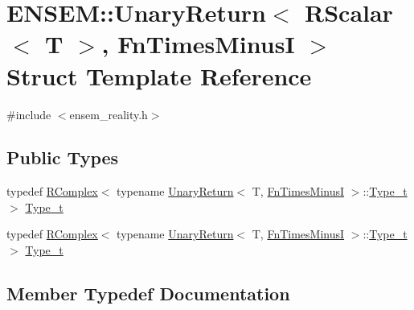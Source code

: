\hypertarget{structENSEM_1_1UnaryReturn_3_01RScalar_3_01T_01_4_00_01FnTimesMinusI_01_4}{}\section{E\+N\+S\+EM\+:\+:Unary\+Return$<$ R\+Scalar$<$ T $>$, Fn\+Times\+MinusI $>$ Struct Template Reference}
\label{structENSEM_1_1UnaryReturn_3_01RScalar_3_01T_01_4_00_01FnTimesMinusI_01_4}


{\ttfamily \#include $<$ensem\+\_\+reality.\+h$>$}

\subsection*{Public Types}
\begin{DoxyCompactItemize}
\item 
typedef \mbox{\hyperlink{classENSEM_1_1RComplex}{R\+Complex}}$<$ typename \mbox{\hyperlink{structENSEM_1_1UnaryReturn}{Unary\+Return}}$<$ T, \mbox{\hyperlink{structENSEM_1_1FnTimesMinusI}{Fn\+Times\+MinusI}} $>$\+::\mbox{\hyperlink{structENSEM_1_1UnaryReturn_3_01RScalar_3_01T_01_4_00_01FnTimesMinusI_01_4_a89dcc5ccc293077b2cb0c8328b6c883a}{Type\+\_\+t}} $>$ \mbox{\hyperlink{structENSEM_1_1UnaryReturn_3_01RScalar_3_01T_01_4_00_01FnTimesMinusI_01_4_a89dcc5ccc293077b2cb0c8328b6c883a}{Type\+\_\+t}}
\item 
typedef \mbox{\hyperlink{classENSEM_1_1RComplex}{R\+Complex}}$<$ typename \mbox{\hyperlink{structENSEM_1_1UnaryReturn}{Unary\+Return}}$<$ T, \mbox{\hyperlink{structENSEM_1_1FnTimesMinusI}{Fn\+Times\+MinusI}} $>$\+::\mbox{\hyperlink{structENSEM_1_1UnaryReturn_3_01RScalar_3_01T_01_4_00_01FnTimesMinusI_01_4_a89dcc5ccc293077b2cb0c8328b6c883a}{Type\+\_\+t}} $>$ \mbox{\hyperlink{structENSEM_1_1UnaryReturn_3_01RScalar_3_01T_01_4_00_01FnTimesMinusI_01_4_a89dcc5ccc293077b2cb0c8328b6c883a}{Type\+\_\+t}}
\end{DoxyCompactItemize}


\subsection{Member Typedef Documentation}
\mbox{\label{structENSEM_1_1UnaryReturn_3_01RScalar_3_01T_01_4_00_01FnTimesMinusI_01_4_a89dcc5ccc293077b2cb0c8328b6c883a}} 
